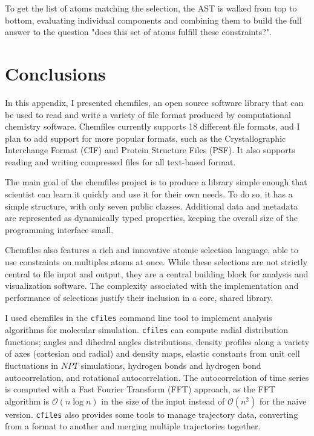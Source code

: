 \documentclass[thesis]{subfiles}
\begin{document}
To get the list of atoms matching the selection, the AST is walked from top to
bottom, evaluating individual components and combining them to build the full
answer to the question "does this set of atoms fulfill these constraints?".

\section*{Conclusions}

In this appendix, I presented chemfiles, an open source \cxx software library
that can be used to read and write a variety of file format produced by
computational chemistry software. Chemfiles currently supports 18 different
file formats, and I plan to add support for more popular formats, such as the
Crystallographic Interchange Format (CIF) and Protein Structure Files (PSF). It
also supports reading and writing compressed files for all text-based format.

The main goal of the chemfiles project is to produce a library simple enough
that scientist can learn it quickly and use it for their own needs. To do so, it
has a simple structure, with only seven public classes. Additional data and
metadata are represented as dynamically typed properties, keeping the overall
size of the programming interface small.

Chemfiles also features a rich and innovative atomic selection language, able to
use constraints on multiples atoms at once. While these selections are not
strictly central to file input and output, they are a central building block for
analysis and visualization software. The complexity associated with the
implementation and performance of selections justify their inclusion in a core,
shared library.

I used chemfiles in the \texttt{cfiles} command line tool to implement analysis
algorithms for molecular simulation. \texttt{cfiles} can compute radial
distribution functions; angles and dihedral angles distributions, density
profiles along a variety of axes (cartesian and radial) and density maps,
elastic constants from unit cell fluctuations in $NPT$
simulations\cite{Clavier2017}, hydrogen bonds and hydrogen bond autocorrelation,
and rotational autocorrelation. The autocorrelation of time series is computed
with a Fast Fourier Transform (FFT) approach, as the FFT algorithm is
$\mathcal{O}(n \log n)$ in the size of the input instead of $\mathcal{O}(n^2)$
for the naive version\cite{Kneller1995}. \texttt{cfiles} also provides some
tools to manage trajectory data, converting from a format to another and merging
multiple trajectories together.

\OnlyInSubfile{\printglobalbibliography}
\end{document}
